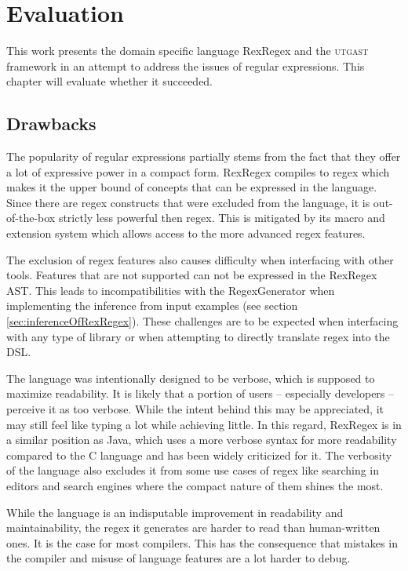 \chapter{Evaluation}

This work presents the domain specific language RexRegex and the \textsc{utgast} framework in an attempt to address the issues of regular expressions. This chapter will evaluate whether it succeeded.

\section{Drawbacks}

The popularity of regular expressions partially stems from the fact that they offer a lot of expressive power in a compact form. RexRegex compiles to regex which makes it the upper bound of concepts that can be expressed in the language. Since there are regex constructs that were excluded from the language, it is out-of-the-box strictly less powerful then regex. This is mitigated by its macro and extension system which allows access to the more advanced regex features.

The exclusion of regex features also causes difficulty when interfacing with other tools. Features that are not supported can not be expressed in the RexRegex AST. This leads to incompatibilities with the RegexGenerator \cite{bartoli2016inference} when implementing the inference from input examples (see section \ref{sec:inferenceOfRexRegex}). These challenges are to be expected when interfacing with any type of library or when attempting to directly translate regex into the DSL.

The language was intentionally designed to be verbose, which is supposed to maximize readability. It is likely that a portion of users -- especially developers -- perceive it as too verbose. While the intent behind this may be appreciated, it may still feel like typing a lot while achieving little. In this regard, RexRegex is in a similar position as Java, which uses a more verbose syntax for more readability compared to the C language and has been widely criticized for it. The verbosity of the language also excludes it from some use cases of regex like searching in editors and search engines where the compact nature of them shines the most.

While the language is an indisputable improvement in readability and maintainability, the regex it generates are harder to read than human-written ones. It is the case for most compilers. This has the consequence that mistakes in the compiler and misuse of language features are a lot harder to debug.

